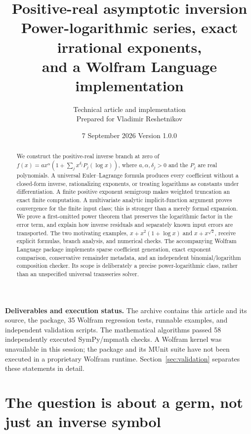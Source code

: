 \documentclass[11pt,a4paper]{article}
\title{\vspace{-12mm}\textbf{Positive-real asymptotic inversion}\\[5pt]
\Large Power-logarithmic series, exact irrational exponents,\\
and a Wolfram Language implementation}
\author{Technical article and implementation\\Prepared for Vladimir Reshetnikov}
\date{7 September 2026 \quad\textbullet\quad Version 1.0.0}
\numberwithin{equation}{section}
\theoremstyle{definition}\newtheorem{definition}[theorem]{Definition}
\theoremstyle{remark}\newtheorem{remark}[theorem]{Remark}
\begin{document}
\maketitle
\begin{abstract}
We construct the positive-real inverse branch at zero of
\(f(x)=a x^\alpha(1+\sum_j x^{\delta_j}P_j(\log x))\), where
\(a,\alpha,\delta_j>0\) and the \(P_j\) are real polynomials.
A universal Euler--Lagrange formula produces every coefficient without a
closed-form inverse, rationalizing exponents, or treating logarithms as
constants under differentiation. A finite positive exponent semigroup makes
weighted truncation an exact finite computation. A multivariate analytic
implicit-function argument proves convergence for the finite input class;
this is stronger than a merely formal expansion. We prove a first-omitted
power theorem that preserves the logarithmic factor in the error term, and
explain how inverse residuals and separately known input errors are transported.
The two motivating examples, \(x+x^2(1+\log x)\) and \(x+x^{\sqrt2}\), receive
explicit formulas, branch analysis, and numerical checks. The accompanying
Wolfram Language package implements sparse coefficient generation, exact
exponent comparison, conservative remainder metadata, and an independent
binomial/logarithm composition checker. Its scope is deliberately a precise
power-logarithmic class, rather than an unspecified universal transseries
solver.
\end{abstract}

\noindent\textbf{Deliverables and execution status.}
The archive contains this article and its source, the package, 35 Wolfram
regression tests, runnable examples, and independent validation scripts.
The mathematical algorithms passed 58 independently executed SymPy/mpmath
checks. A Wolfram kernel was unavailable in this session; the package and its
MUnit suite have not been executed in a proprietary Wolfram runtime.
Section~\ref{sec:validation} separates these statements in detail.

\newpage
\setcounter{tocdepth}{1}
{\small\setlength{\parskip}{0pt}\tableofcontents}
\newpage

\section{The question is about a germ, not just an inverse symbol}
\label{sec:question}
\end{document}
